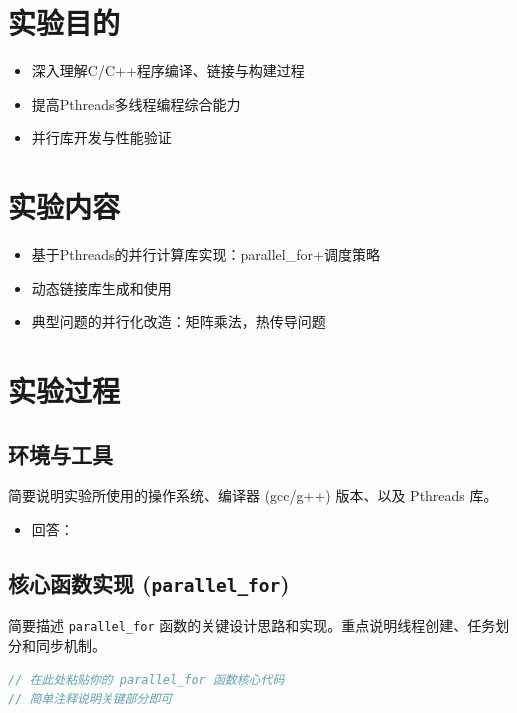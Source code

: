 \documentclass{SYSUReport}
\date{2025年4月30日}
\begin{document}
\cover
\thispagestyle{empty} %
\clearpage



\section{实验目的}
\begin{itemize}
  \item 深入理解C/C++程序编译、链接与构建过程
\item 提高Pthreads多线程编程综合能力
\item 并行库开发与性能验证
\end{itemize}

\section{实验内容}
\begin{itemize}
 \item 基于Pthreads的并行计算库实现：parallel\_for+调度策略
\item 动态链接库生成和使用
\item  典型问题的并行化改造：矩阵乘法，热传导问题
\end{itemize}

\section{实验过程}

\subsection{环境与工具}
简要说明实验所使用的操作系统、编译器 (gcc/g++) 版本、以及 Pthreads 库。
\begin{itemize}
    \item 回答：
\end{itemize}
\subsection{核心函数实现 (\texttt{parallel\_for})}
简要描述 \texttt{parallel\_for} 函数的关键设计思路和实现。重点说明线程创建、任务划分和同步机制。
\begin{lstlisting}[language=C++, caption={parallel\_for 函数核心代码片段}]
// 在此处粘贴你的 parallel_for 函数核心代码
// 简单注释说明关键部分即可
\end{lstlisting}
\end{document}
